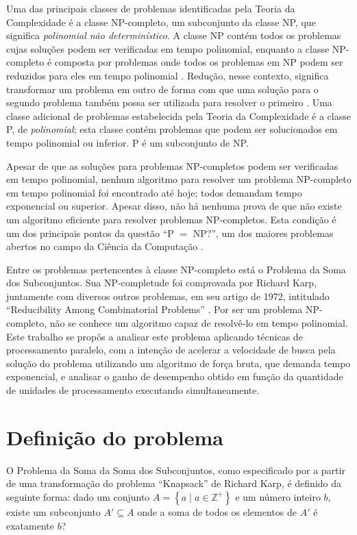 \documentclass[12pt]{article}
\begin{document}
Uma das principais classes de problemas identificadas pela Teoria da Complexidade é a classe NP-completo, um subconjunto da classe NP, que significa \textit{polinomial não determinístico}. A classe NP contém todos os problemas cujas soluções podem ser verificadas em tempo polinomial, enquanto a classe NP-completo é composta por problemas onde todos os problemas em NP podem ser reduzidos para eles em tempo polinomial \cite{Garey1979}. Redução, nesse contexto, significa transformar um problema em outro de forma com que uma solução para o segundo problema também possa ser utilizada para resolver o primeiro \cite{Sipser1996}. Uma classe adicional de problemas estabelecida pela Teoria da Complexidade é a classe P, de \textit{polinomial}; esta classe contém problemas que podem ser solucionados em tempo polinomial ou inferior. P é um subconjunto de NP.

Apesar de que as soluções para problemas NP-completos podem ser verificadas em tempo polinomial, nenhum algoritmo para resolver um problema NP-completo em tempo polinomial foi encontrado até hoje; todos demandam tempo exponencial ou superior. Apesar disso, não há nenhuma prova de que não existe um algoritmo eficiente para resolver problemas NP-completos. Esta condição é um dos principais pontos da questão ``P $=$ NP?'', um dos maiores problemas abertos no campo da Ciência da Computação \cite{Sipser1996}.

Entre os problemas pertencentes à classe NP-completo está o Problema da Soma dos Subconjuntos. Sua NP-completude foi comprovada por Richard Karp, juntamente com diversos outros problemas, em seu artigo de 1972, intitulado ``Reducibility Among Combinatorial Problems'' \cite{Karp1972}. Por ser um problema NP-completo, não se conhece um algoritmo capaz de resolvê-lo em tempo polinomial. Este trabalho se propôs a analisar este problema aplicando técnicas de processamento paralelo, com a intenção de acelerar a velocidade de busca pela solução do problema utilizando um algoritmo de força bruta, que demanda tempo exponencial, e analisar o ganho de desempenho obtido em função da quantidade de unidades de processamento executando simultaneamente.

\section{Definição do problema} \label{sec:def}

O Problema da Soma da Soma dos Subconjuntos, como especificado por \cite{Garey1979} a partir de uma transformação do problema ``Knapsack'' de Richard Karp, é definido da seguinte forma: dado um conjunto $A = \left\{a \mid a \in \mathbb{Z}^{+}\right\}$ e um número inteiro $b$, existe um subconjunto $A' \subseteq A$ onde a soma de todos os elementos de $A'$ é exatamente $b$?
\end{document}
